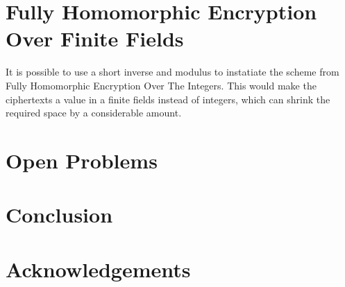 \documentclass[preprint]{iacrtrans}
\begin{document}
\section{Fully Homomorphic Encryption Over Finite Fields}
It is possible to use a short inverse and modulus to instatiate the scheme from Fully Homomorphic Encryption Over The Integers. This would make the ciphertexts a value in a finite fields instead of integers, which can shrink the required space by a considerable amount.

\section{Open Problems}

\section{Conclusion}


\section*{Acknowledgements}
\end{document}
